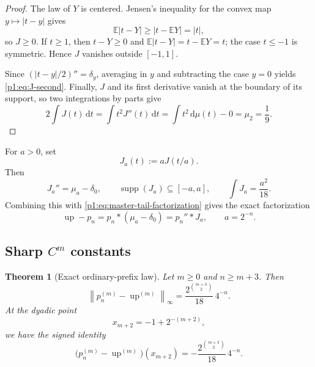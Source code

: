\documentclass[11pt]{article}
\numberwithin{equation}{section}
\newtheorem{theorem}{Theorem}[section]
\theoremstyle{definition}
\theoremstyle{remark}
\DeclareMathOperator{\supp}{supp}
\newcommand{\E}{\mathbb E}
\newcommand{\Up}{\operatorname{up}}
\newcommand{\dd}{\,\mathrm d}
\newcommand{\abs}[1]{\left|#1\right|}
\newcommand{\norm}[1]{\left\lVert#1\right\rVert}
\begin{document}
\begin{proof}
The law of $Y$ is centered.  Jensen's inequality for the convex map $y\mapsto\abs{t-y}$ gives
\[
 \E\abs{t-Y}\ge\abs{t-\E Y}=\abs t,
\]
so $J\ge0$.  If $t\ge1$, then $t-Y\ge0$ and
\(\E\abs{t-Y}=t-\E Y=t\); the case $t\le-1$ is symmetric.  Hence $J$ vanishes outside $[-1,1]$.

Since \((\abs{t-y}/2)''=\delta_y\), averaging in $y$ and subtracting the case $y=0$ yields \eqref{p1:eq:J-second}.  Finally, $J$ and its first derivative vanish at the boundary of its support, so two integrations by parts give
\[
 2\int J(t)\dd t
 =\int t^2J''(t)\dd t
 =\int t^2\dd\mu(t)-0
 =\mu_2=\frac19.
\]
\end{proof}

For $a>0$, set
\begin{equation}
 J_a(t):=aJ(t/a).
 \label{p1:eq:Ja}
\end{equation}
Then
\begin{equation}
 J_a''=\mu_a-\delta_0,
 \qquad
 \supp(J_a)\subseteq[-a,a],
 \qquad
 \int J_a=\frac{a^2}{18}.
 \label{p1:eq:Ja-properties}
\end{equation}
Combining this with \eqref{p1:eq:master-tail-factorization} gives the exact factorization
\begin{equation}
 \boxed{\Up-p_n=p_n*(\mu_a-\delta_0)=p_n''*J_a,\qquad a=2^{-n}.}
 \label{p1:eq:ordinary-factorization}
\end{equation}

\subsection{Sharp $C^m$ constants}

\begin{theorem}[Exact ordinary-prefix law]
\label{p1:thm:ordinary-exact}
Let $m\ge0$ and $n\ge m+3$.  Then
\begin{equation}
 \boxed{
 \norm{p_n^{(m)}-\Up^{(m)}}_\infty
 =\frac{2^{\binom{m+3}{2}}}{18}\,4^{-n}.}
 \label{p1:eq:ordinary-exact}
\end{equation}
At the dyadic point
\begin{equation}
 x_{m+2}=-1+2^{-(m+2)},
 \label{p1:eq:ordinary-extremal-point}
\end{equation}
we have the signed identity
\begin{equation}
 \boxed{
 \bigl(p_n^{(m)}-\Up^{(m)}\bigr)(x_{m+2})
 =-\frac{2^{\binom{m+3}{2}}}{18}\,4^{-n}.}
 \label{p1:eq:ordinary-signed}
\end{equation}
\end{theorem}
\end{document}
